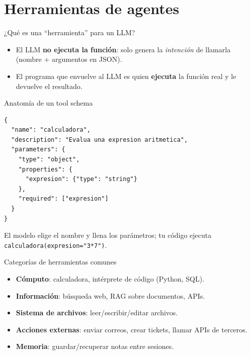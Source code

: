 \section{Herramientas de agentes}

\begin{frame}{¿Qué es una ``herramienta'' para un LLM?}
  \vfill
  \begin{itemize}
    \item El LLM \textbf{no ejecuta la función}: solo genera la
      \emph{intención} de llamarla (nombre + argumentos en JSON).
    \item El programa que envuelve al LLM es quien \textbf{ejecuta} la
      función real y le devuelve el resultado.
  \end{itemize}
\end{frame}

\begin{frame}[fragile]{Anatomía de un tool schema}
  \footnotesize
\begin{verbatim}
{
  "name": "calculadora",
  "description": "Evalua una expresion aritmetica",
  "parameters": {
    "type": "object",
    "properties": {
      "expresion": {"type": "string"}
    },
    "required": ["expresion"]
  }
}
\end{verbatim}
  \vfill
  \normalsize El modelo elige el nombre y llena los parámetros; tu código
  ejecuta \texttt{calculadora(expresion="3*7")}.
\end{frame}

\begin{frame}{Categorías de herramientas comunes}
  \small
  \begin{itemize}
    \item \textbf{Cómputo}: calculadora, intérprete de código (Python, SQL).
    \item \textbf{Información}: búsqueda web, RAG sobre documentos, APIs.
    \item \textbf{Sistema de archivos}: leer/escribir/editar archivos.
    \item \textbf{Acciones externas}: enviar correos, crear tickets, llamar APIs de terceros.
    \item \textbf{Memoria}: guardar/recuperar notas entre sesiones.
  \end{itemize}
\end{frame}

